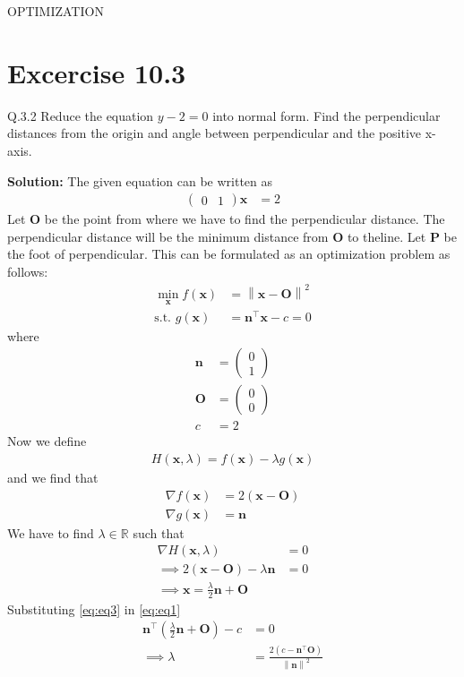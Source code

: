 \documentclass[12pt]{article}
\providecommand{\brak}[1]{\ensuremath{\left(#1\right)}}
\providecommand{\norm}[1]{\left\lVert#1\right\rVert}
\newcommand{\solution}{\noindent \textbf{Solution: }}
\newcommand{\myvec}[1]{\ensuremath{\begin{pmatrix}#1\end{pmatrix}}}
\let\vec\mathbf
\begin{document}
\begin{center}
\textbf\large{OPTIMIZATION}

\end{center}
\section*{Excercise 10.3}

Q.3.2 Reduce the equation $y-2=0$ into normal form. Find the perpendicular distances from the origin and angle between perpendicular and the positive x-axis.

\solution
The given equation can be written as
\begin{align}
	\label{eq:eq1}
	\myvec{0&1}\vec{x} &= 2
\end{align}
Let $\vec{O}$ be the point from where we have to find the perpendicular distance. The perpendicular distance will be the minimum distance from $\vec{O}$ to theline. Let $\vec{P}$ be the foot of perpendicular. This can be formulated as an optimization problem as follows:
\begin{align}
	\min_{\vec{x}}f\brak{\vec{x}} &= \norm{\vec{x}-\vec{O}}^2\\
	\text{s.t. } g\brak{\vec{x}} &= \vec{n}^\top\vec{x}-c=0
\end{align}
where
\begin{align}
	\vec{n} &= \myvec{0\\1}\\
	\vec{O} &= \myvec{0\\0}\\
	c &= 2
\end{align}
Now we define
\begin{align}
	H\brak{\vec{x},\lambda} = f\brak{\vec{x}} - \lambda g\brak{\vec{x}}
\end{align}
and we find that
\begin{align}
	\nabla f\brak{\vec{x}} &= 2\brak{\vec{x}-\vec{O}}\\
	\nabla g\brak{\vec{x}} &= \vec{n}
\end{align}
We have to find $\lambda \in \mathbb{R}$ such that
\begin{align}
	\nabla H\brak{\vec{x},\lambda} &= 0\\
	\label{eq:eq2}
	\implies 2\brak{\vec{x}-\vec{O}}-\lambda\vec{n} &= 0\\
	\label{eq:eq3}
	\implies \vec{x} = \frac{\lambda}{2}\vec{n}+\vec{O}
\end{align}
Substituting \eqref{eq:eq3} in \eqref{eq:eq1}
\begin{align}
	\vec{n}^\top\brak{\frac{\lambda}{2}\vec{n}+\vec{O}} - c &= 0\\
	\implies \lambda &= \frac{2\brak{c-\vec{n}^\top\vec{O}}}{\norm{\vec{n}}^2}
\end{align}
\end{document}
